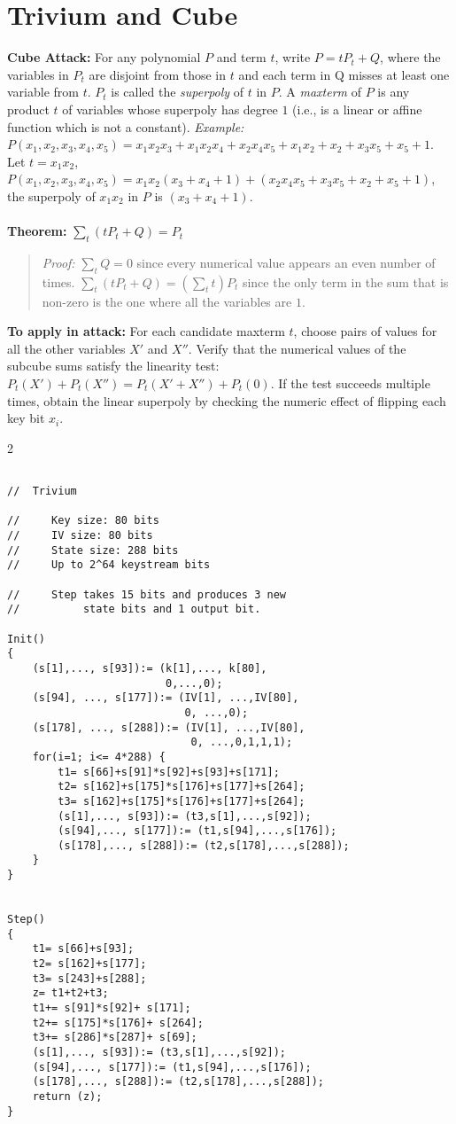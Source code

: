 \section{Trivium and Cube}
{\bf Cube Attack:}
For any polynomial $P$ and term $t$, write $P= tP_t+Q$, where
the variables in $P_t$ are disjoint from those in $t$
and each term in Q misses at least one variable from $t$.
$P_t$ is called the \emph{superpoly} of $t$ in $P$.  
A \emph{maxterm} of $P$ is any product $t$ of variables whose superpoly has degree $1$ 
(i.e., is a linear or affine function which is not a constant).
\emph{Example:}
$P(x_1,x_2,x_3,x_4,x_5) =x_1x_2x_3+x_1x_2x_4+x_2x_4x_5+x_1x_2+x_2+x_3x_5+x_5+1 $.
Let $t=x_1x_2$, $P(x_1,x_2,x_3,x_4,x_5)= x_1x_2(x_3+x_4+1)+(x_2x_4x_5+x_3x_5+x_2+x_5+1)$,
the superpoly of $x_1x_2$ in $P$ is $(x_3+x_4+1)$.
\\
\\
{\bf Theorem:} 
$\sum_t (tP_t+Q) = P_t$
\begin{quote}
\emph{Proof:}
$\sum_t Q = 0$ since every numerical value appears an even number of times.
$\sum_t (tP_t+Q) = 
(\sum_t t) P_t$ since the only term in the sum that is non-zero is the one where all the variables are $1$.
\end{quote}
{\bf To apply in attack:}
For each candidate maxterm $t$, choose pairs of values for all the other variables 
$X'$ and $X''$. Verify that the numerical values of the subcube sums satisfy the linearity test:  
$P_t(X')+P_t(X'')= P_t(X'+X'')+P_t(0)$.
If the test succeeds multiple times, obtain the linear superpoly by checking the 
numeric effect of flipping each key bit $x_i$.
\begin {multicols} {2} {
\begin {verbatim}

//  Trivium

//     Key size: 80 bits
//     IV size: 80 bits
//     State size: 288 bits
//     Up to 2^64 keystream bits

//     Step takes 15 bits and produces 3 new 
//          state bits and 1 output bit.

Init() 
{
    (s[1],..., s[93]):= (k[1],..., k[80], 
                         0,...,0);
    (s[94], ..., s[177]):= (IV[1], ...,IV[80], 
                            0, ...,0);
    (s[178], ..., s[288]):= (IV[1], ...,IV[80], 
                             0, ...,0,1,1,1);
    for(i=1; i<= 4*288) {
        t1= s[66]+s[91]*s[92]+s[93]+s[171];
        t2= s[162]+s[175]*s[176]+s[177]+s[264];
        t3= s[162]+s[175]*s[176]+s[177]+s[264];
        (s[1],..., s[93]):= (t3,s[1],...,s[92]);
        (s[94],..., s[177]):= (t1,s[94],...,s[176]);
        (s[178],..., s[288]):= (t2,s[178],...,s[288]);
    }
}


Step() 
{
    t1= s[66]+s[93];
    t2= s[162]+s[177];
    t3= s[243]+s[288];
    z= t1+t2+t3;
    t1+= s[91]*s[92]+ s[171];
    t2+= s[175]*s[176]+ s[264];
    t3+= s[286]*s[287]+ s[69];
    (s[1],..., s[93]):= (t3,s[1],...,s[92]);
    (s[94],..., s[177]):= (t1,s[94],...,s[176]);
    (s[178],..., s[288]):= (t2,s[178],...,s[288]);
    return (z);
}

\end{verbatim}
}
\end {multicols}
